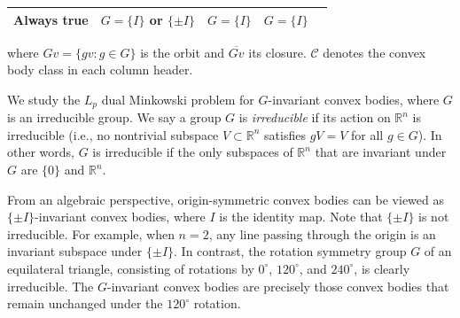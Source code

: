 \documentclass[12pt, reqno]{amsart}
\theoremstyle{definition}
\theoremstyle{remark}
\numberwithin{equation}{section}
\newcommand{\Rn}{\mathbb{R}^{n}}
\newcommand{\Lp}{L_{p}}
\begin{document}
\begin{table}[h]
\begin{tabular}{|c|c|c|c|c|}
\begin{minipage}{0.18\textwidth}
	   			\vspace{0.2em}
	   			Always true
	   			\vspace{0.2em}
	   		\end{minipage} & 
	   		\begin{minipage}{0.18\textwidth}
	   			\vspace{0.2em}
	   			$G = \{I\}$ or $\{\pm I\}$
	   			\vspace{0.2em}
	   		\end{minipage} & 
	   		\begin{minipage}{0.18\textwidth}
	   			$G = \{I\}$
	   		\end{minipage} &
	   		\begin{minipage}{0.18\textwidth}
	   			$G=\{I\}$
	   		\end{minipage} \\
	   		\hline
	   	\end{tabular}
	   \end{table} 
	  where $Gv = \{ gv : g \in G \}$ is the orbit and $\overline{Gv}$ its closure. $\mathcal{C}$ denotes the convex body class in each column header.
	   
	   
	   
	   


	
	

	
	
We study the $\Lp$ dual Minkowski problem for $G$-invariant convex bodies, where $G$ is an irreducible group.
	We say a group $G$ is \textit{irreducible} if its action on $\mathbb{R}^n$ is irreducible  (i.e., no nontrivial subspace $V \subset \mathbb{R}^n$ satisfies $gV = V$ for all $g \in G$). In other words, 	 $G $ is irreducible if the only subspaces of $ \mathbb{R}^n$ that are invariant under $G$  are $\{0\}$ and $\mathbb{R}^n$.
	

From an algebraic perspective, origin-symmetric convex bodies  can be viewed as $\{\pm I\}$-invariant convex bodies, where $I$ is the identity map. Note that $\{\pm I\}$ is not irreducible. For example, when $n=2$, any line passing through the origin is an invariant subspace under $\{\pm I\}$. 
In contrast, the rotation symmetry group $G$ of an equilateral triangle, consisting of rotations by $0^\circ$, $120^\circ$, and $240^\circ$, is clearly irreducible. The $G$-invariant convex bodies  are precisely those convex bodies that remain unchanged under the $120^\circ$  rotation.
\end{document}
